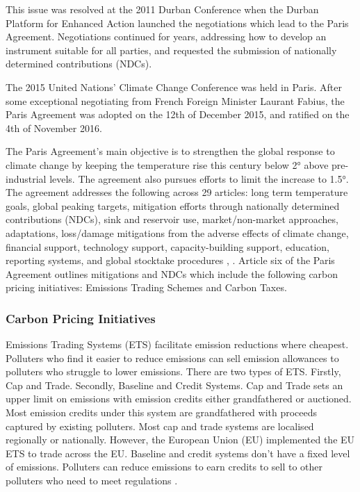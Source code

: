 \documentclass[12pt]{article}
\begin{document}
This issue was resolved at the 2011 Durban Conference when the Durban Platform for Enhanced Action launched the negotiations which lead to the Paris Agreement. 
Negotiations continued for years, addressing how to develop an instrument suitable for all parties, and requested the submission of nationally determined contributions (NDCs)\cite{J:5}.

The 2015 United Nations' Climate Change Conference was held in Paris. 
After some exceptional negotiating from French Foreign Minister Laurant Fabius, the Paris Agreement was adopted on the 12th of December 2015, and ratified on the 4th of November 2016.

The Paris Agreement's main objective is to strengthen the global response to climate change by keeping the temperature rise this century below 2\si{\degree} above pre-industrial levels. 
The agreement also pursues efforts to limit the increase to 1.5\si{\degree}. 
The agreement addresses the following across 29 articles: long term temperature goals, global peaking targets, mitigation efforts through nationally determined contributions (NDCs), sink and reservoir use, market/non-market approaches, adaptations, loss/damage mitigations from the 
adverse effects of climate change, financial support, technology support, capacity-building support, education, reporting systems, and global stocktake procedures \cite{W:8}, \cite{TR:6}. 
Article six of the Paris Agreement outlines mitigations and NDCs which include the following carbon pricing initiatives: Emissions Trading Schemes and Carbon Taxes.

\subsubsection{Carbon Pricing Initiatives}
Emissions Trading Systems (ETS) facilitate emission reductions where cheapest.
Polluters who find it easier to reduce emissions can sell emission allowances to polluters who struggle to lower emissions. 
There are two types of ETS. Firstly, Cap and Trade. Secondly, Baseline and Credit Systems. 
Cap and Trade sets an upper limit on emissions with emission credits either grandfathered or auctioned. 
Most emission credits under this system are grandfathered with proceeds captured by existing polluters. 
Most cap and trade systems are localised regionally or nationally. 
However, the European Union (EU) implemented the EU ETS to trade across the EU.
Baseline and credit systems don't have a fixed level of emissions. 
Polluters can reduce emissions to earn credits to sell to other polluters who need to meet regulations \cite{J:6}.
\end{document}

